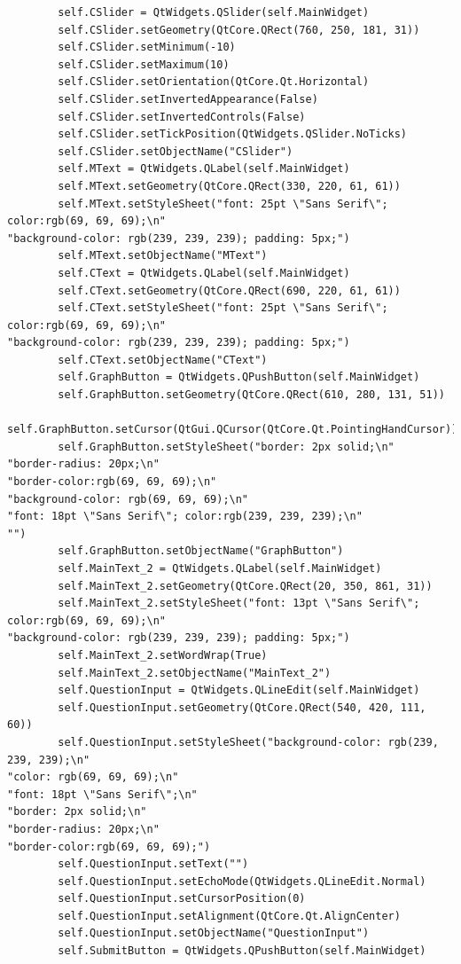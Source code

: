 \documentclass{article}
\begin{document}
\begin{lstlisting}
        self.CSlider = QtWidgets.QSlider(self.MainWidget)
        self.CSlider.setGeometry(QtCore.QRect(760, 250, 181, 31))
        self.CSlider.setMinimum(-10)
        self.CSlider.setMaximum(10)
        self.CSlider.setOrientation(QtCore.Qt.Horizontal)
        self.CSlider.setInvertedAppearance(False)
        self.CSlider.setInvertedControls(False)
        self.CSlider.setTickPosition(QtWidgets.QSlider.NoTicks)
        self.CSlider.setObjectName("CSlider")
        self.MText = QtWidgets.QLabel(self.MainWidget)
        self.MText.setGeometry(QtCore.QRect(330, 220, 61, 61))
        self.MText.setStyleSheet("font: 25pt \"Sans Serif\"; color:rgb(69, 69, 69);\n"
"background-color: rgb(239, 239, 239); padding: 5px;")
        self.MText.setObjectName("MText")
        self.CText = QtWidgets.QLabel(self.MainWidget)
        self.CText.setGeometry(QtCore.QRect(690, 220, 61, 61))
        self.CText.setStyleSheet("font: 25pt \"Sans Serif\"; color:rgb(69, 69, 69);\n"
"background-color: rgb(239, 239, 239); padding: 5px;")
        self.CText.setObjectName("CText")
        self.GraphButton = QtWidgets.QPushButton(self.MainWidget)
        self.GraphButton.setGeometry(QtCore.QRect(610, 280, 131, 51))
        self.GraphButton.setCursor(QtGui.QCursor(QtCore.Qt.PointingHandCursor))
        self.GraphButton.setStyleSheet("border: 2px solid;\n"
"border-radius: 20px;\n"
"border-color:rgb(69, 69, 69);\n"
"background-color: rgb(69, 69, 69);\n"
"font: 18pt \"Sans Serif\"; color:rgb(239, 239, 239);\n"
"")
        self.GraphButton.setObjectName("GraphButton")
        self.MainText_2 = QtWidgets.QLabel(self.MainWidget)
        self.MainText_2.setGeometry(QtCore.QRect(20, 350, 861, 31))
        self.MainText_2.setStyleSheet("font: 13pt \"Sans Serif\"; color:rgb(69, 69, 69);\n"
"background-color: rgb(239, 239, 239); padding: 5px;")
        self.MainText_2.setWordWrap(True)
        self.MainText_2.setObjectName("MainText_2")
        self.QuestionInput = QtWidgets.QLineEdit(self.MainWidget)
        self.QuestionInput.setGeometry(QtCore.QRect(540, 420, 111, 60))
        self.QuestionInput.setStyleSheet("background-color: rgb(239, 239, 239);\n"
"color: rgb(69, 69, 69);\n"
"font: 18pt \"Sans Serif\";\n"
"border: 2px solid;\n"
"border-radius: 20px;\n"
"border-color:rgb(69, 69, 69);")
        self.QuestionInput.setText("")
        self.QuestionInput.setEchoMode(QtWidgets.QLineEdit.Normal)
        self.QuestionInput.setCursorPosition(0)
        self.QuestionInput.setAlignment(QtCore.Qt.AlignCenter)
        self.QuestionInput.setObjectName("QuestionInput")
        self.SubmitButton = QtWidgets.QPushButton(self.MainWidget)

\end{lstlisting}
\end{document}
